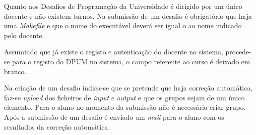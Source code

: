 Quanto aos Desafios de Programação da Universidade é dirigido por um único docente e não existem turnos. Na submissão de um desafio é obrigatório que haja uma \emph{Makefile} e que o nome do executável deverá ser igual o ao nome indicado pelo docente.

Assumindo que já existe o registo e autenticação do docente no sistema, procede-se para o registo do DPUM no sistema, o campo referente ao curso é deixado em branco.

Na criação de um desafio indica-se que se pretende que haja correção automática, faz-se \emph{upload} dos ficheiros de \emph{input} e \emph{output} e que os grupos sejam de um único elemento. Para o aluno no momento da submissão não é necessário criar grupo. Após a submissão de um desafio é enviado um \emph{mail} para o aluno com os resultados da correção automática.


\newpage





